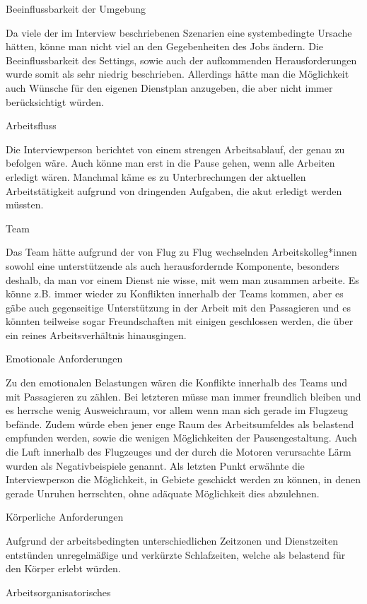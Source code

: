 \documentclass[12pt, a4paper]{article}
\begin{document}
Beeinflussbarkeit der Umgebung

Da viele der im Interview beschriebenen Szenarien eine systembedingte Ursache hätten, könne man nicht viel an den Gegebenheiten des Jobs ändern. Die Beeinflussbarkeit des Settings, sowie auch der aufkommenden Herausforderungen wurde somit als sehr niedrig beschrieben. Allerdings hätte man die Möglichkeit auch Wünsche für den eigenen Dienstplan anzugeben, die aber nicht immer berücksichtigt würden.

Arbeitsfluss

Die Interviewperson berichtet von einem strengen Arbeitsablauf, der genau zu befolgen wäre. Auch könne man erst in die Pause gehen, wenn alle Arbeiten erledigt wären. Manchmal käme es zu Unterbrechungen der aktuellen Arbeitstätigkeit aufgrund von dringenden Aufgaben, die akut erledigt werden müssten.

Team

Das Team hätte aufgrund der von Flug zu Flug wechselnden Arbeitskolleg*innen sowohl eine unterstützende als auch herausfordernde Komponente, besonders deshalb, da man vor einem Dienst nie wisse, mit wem man zusammen arbeite. Es könne z.B. immer wieder zu Konflikten innerhalb der Teams kommen, aber es gäbe auch gegenseitige Unterstützung in der Arbeit mit den Passagieren und es könnten teilweise sogar Freundschaften mit einigen geschlossen werden, die über ein reines Arbeitsverhältnis hinausgingen.

Emotionale Anforderungen

Zu den emotionalen Belastungen wären die Konflikte innerhalb des Teams und mit Passagieren zu zählen. Bei letzteren müsse man immer freundlich bleiben und es herrsche wenig Ausweichraum, vor allem wenn man sich gerade im Flugzeug befände. Zudem würde eben jener enge Raum des Arbeitsumfeldes als belastend empfunden werden, sowie die wenigen Möglichkeiten der Pausengestaltung. Auch die Luft innerhalb des Flugzeuges und der durch die Motoren verursachte Lärm wurden als Negativbeispiele genannt. Als letzten Punkt erwähnte die Interviewperson die Möglichkeit, in Gebiete geschickt werden zu können, in denen gerade Unruhen herrschten, ohne adäquate Möglichkeit dies abzulehnen.

Körperliche Anforderungen

Aufgrund der arbeitsbedingten unterschiedlichen Zeitzonen und Dienstzeiten entstünden unregelmäßige und verkürzte Schlafzeiten, welche als belastend für den Körper erlebt würden.

Arbeitsorganisatorisches
\end{document}
